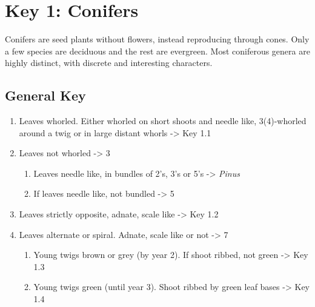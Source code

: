 \documentclass[openany]{book}
\providecommand{\tightlist}{%
  \setlength{\itemsep}{0pt}\setlength{\parskip}{0pt}}
\begin{document}
\hypertarget{key-1-conifers}{%
\chapter*{Key 1: Conifers}\label{key-1-conifers}}

Conifers are seed plants without flowers, instead reproducing through
cones. Only a few species are deciduous and the rest are evergreen. Most
coniferous genera are highly distinct, with discrete and interesting
characters.

\hypertarget{general-key-1}{%
\section*{General Key}\label{general-key-1}}

\begin{enumerate}
\def\labelenumi{\arabic{enumi}.}
\tightlist
\item
  Leaves whorled. Either whorled on short shoots and needle like,
  3(4)-whorled around a twig or in large distant whorls -\textgreater{}
  Key 1.1
\item
  Leaves not whorled -\textgreater{} 3

  \begin{enumerate}
  \def\labelenumii{\arabic{enumii}.}
  \setcounter{enumii}{2}
  \tightlist
  \item
    Leaves needle like, in bundles of 2's, 3's or 5's -\textgreater{}
    \emph{Pinus}
  \item
    If leaves needle like, not bundled -\textgreater{} 5
  \end{enumerate}
\item
  Leaves strictly opposite, adnate, scale like -\textgreater{} Key 1.2
\item
  Leaves alternate or spiral. Adnate, scale like or not -\textgreater{}
  7

  \begin{enumerate}
  \def\labelenumii{\arabic{enumii}.}
  \setcounter{enumii}{6}
  \tightlist
  \item
    Young twigs brown or grey (by year 2). If shoot ribbed, not green
    -\textgreater{} Key 1.3
  \item
    Young twigs green (until year 3). Shoot ribbed by green leaf bases
    -\textgreater{} Key 1.4
  \end{enumerate}
\end{enumerate}
\end{document}
